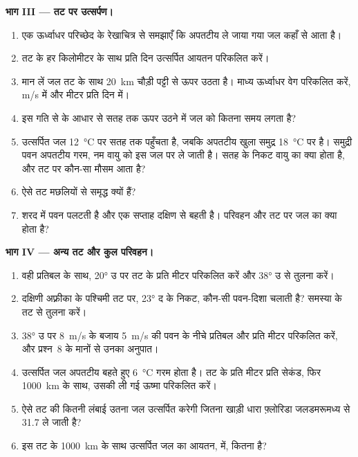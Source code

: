 \begin{problem}
\medskip
\noindent\textbf{भाग III --- तट पर उत्सर्पण।}
\begin{enumerate}[resume]
  \item एक ऊर्ध्वाधर परिच्छेद के रेखाचित्र से समझाएँ कि अपतटीय ले जाया गया जल कहाँ से आता है।
  \item तट के हर किलोमीटर के साथ प्रति दिन उत्सर्पित आयतन परिकलित करें।
  \item मान लें जल तट के साथ \qty{20}{km} चौड़ी पट्टी से ऊपर उठता है। माध्य ऊर्ध्वाधर वेग परिकलित करें, \unit{m/s} में और मीटर प्रति दिन में।
  \item इस गति से  के आधार से सतह तक ऊपर उठने में जल को कितना समय लगता है?
  \item उत्सर्पित जल \qty{12}{\celsius} पर सतह तक पहुँचता है, जबकि अपतटीय खुला समुद्र \qty{18}{\celsius} पर है। समुद्री पवन अपतटीय गरम, नम वायु को इस जल पर ले जाती है। सतह के निकट वायु का क्या होता है, और तट पर कौन-सा मौसम आता है?
  \item ऐसे तट मछलियों से समृद्ध क्यों हैं?
  \item शरद में पवन पलटती है और एक सप्ताह दक्षिण से बहती है। परिवहन और तट पर जल का क्या होता है?
\end{enumerate}

\medskip
\noindent\textbf{भाग IV --- अन्य तट और कुल परिवहन।}
\begin{enumerate}[resume]
  \item वही प्रतिबल के साथ, \ang{20} उ पर तट के प्रति मीटर  परिकलित करें और \ang{38} उ से तुलना करें।
  \item दक्षिणी अफ़्रीका के पश्चिमी तट पर, \ang{23} द के निकट, कौन-सी पवन-दिशा  चलाती है? समस्या के तट से तुलना करें।
  \item \ang{38} उ पर \qty{8}{m/s} के बजाय \qty{5}{m/s} की पवन के नीचे प्रतिबल और प्रति मीटर  परिकलित करें, और प्रश्न~8 के मानों से उनका अनुपात।
  \item उत्सर्पित जल अपतटीय बहते हुए \qty{6}{\celsius} गरम होता है। तट के प्रति मीटर प्रति सेकंड, फिर \qty{1000}{km} के साथ, उसकी ली गई ऊष्मा परिकलित करें।
  \item ऐसे तट की कितनी लंबाई उतना जल उत्सर्पित करेगी जितना खाड़ी धारा फ़्लोरिडा जलडमरूमध्य से \qty{31.7}{\sverdrup} ले जाती है?
  \item इस तट के \qty{1000}{km} के साथ उत्सर्पित जल का आयतन,  में, कितना है?
\end{enumerate}
\end{problem}
